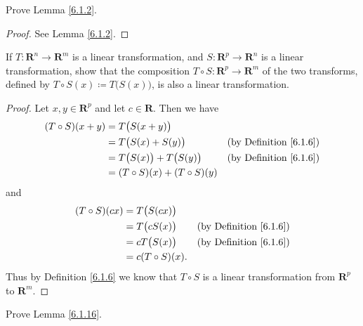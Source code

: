 \exercisesection

\begin{exercise}\label{ex 6.1.1}
    Prove Lemma \ref{6.1.2}.
\end{exercise}

\begin{proof}
    See Lemma \ref{6.1.2}.
\end{proof}

\begin{exercise}\label{ex 6.1.2}
    If \(T : \mathbf{R}^n \to \mathbf{R}^m\) is a linear transformation, and \(S : \mathbf{R}^p \to \mathbf{R}^n\) is a linear transformation, show that the composition \(T \circ S : \mathbf{R}^p \to \mathbf{R}^m\) of the two transforms, defined by \(T \circ S(x) \coloneqq T\big(S(x)\big)\), is also a linear transformation.
\end{exercise}

\begin{proof}
    Let \(x, y \in \mathbf{R}^p\) and let \(c \in \mathbf{R}\).
    Then we have
    \begin{align*}
        (T \circ S)(x + y) & = T\big(S(x + y)\big)                                                    \\
                           & = T\big(S(x) + S(y)\big)            & \text{(by Definition \ref{6.1.6})} \\
                           & = T\big(S(x)\big) + T\big(S(y)\big) & \text{(by Definition \ref{6.1.6})} \\
                           & = (T \circ S)(x) + (T \circ S)(y)
    \end{align*}
    and
    \begin{align*}
        (T \circ S)(cx) & = T\big(S(cx)\big)                                       \\
                        & = T\big(c S(x)\big) & \text{(by Definition \ref{6.1.6})} \\
                        & = c T\big(S(x)\big) & \text{(by Definition \ref{6.1.6})} \\
                        & = c (T \circ S)(x).
    \end{align*}
    Thus by Definition \ref{6.1.6} we know that \(T \circ S\) is a linear transformation from \(\mathbf{R}^p\) to \(\mathbf{R}^m\).
\end{proof}

\begin{exercise}\label{ex 6.1.3}
    Prove Lemma \ref{6.1.16}.
\end{exercise}

